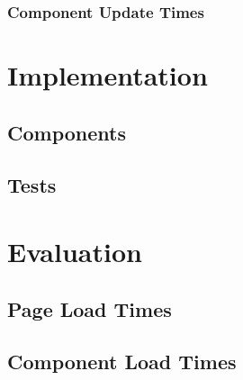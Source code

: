 \documentclass[a4paper, fontsize=11pt]{article}
\begin{document}
\subsubsection{Component Update Times}
% 

\section{Implementation}\label{sec:implementation}
\subsection{Components}\label{subsec:components}
% 
\subsection{Tests}\label{subsec:tests}
% 

\section{Evaluation}\label{sec:evaluation}
\subsection{Page Load Times}\label{subsec:pageloadtimes}

\subsection{Component Load Times}\label{subsec:componentloadtimes}
\end{document}
